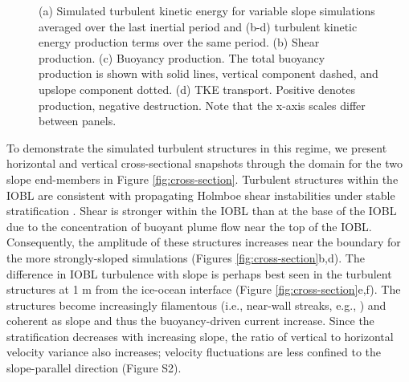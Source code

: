 \documentclass[draft]{agujournal2019}
\begin{document}
\begin{figure}
\begin{minipage}{0.5\textwidth}
    \end{minipage}
    \caption{(a) Simulated turbulent kinetic energy for variable slope simulations averaged over the last inertial period and (b-d) turbulent kinetic energy production terms over the same period. (b) Shear production. (c) Buoyancy production. The total buoyancy production is shown with solid lines, vertical component dashed, and upslope component dotted. (d) TKE transport. Positive denotes production, negative destruction. Note that the x-axis scales differ between panels.}
    \label{fig:tke_budget}
\end{figure}

To demonstrate the simulated turbulent structures in this regime, we present horizontal and vertical cross-sectional  snapshots through the domain for the two slope end-members in Figure \ref{fig:cross-section}. Turbulent structures within the IOBL are consistent with propagating Holmboe shear instabilities under stable stratification \cite{carpenter_identifying_2010}. Shear is stronger within the IOBL than at the base of the IOBL due to the concentration of buoyant plume flow near the top of the IOBL. Consequently, the amplitude of these structures increases near the boundary for the more strongly-sloped simulations (Figures \ref{fig:cross-section}b,d). The difference in IOBL turbulence with slope is perhaps best seen in the turbulent structures at 1 m from the ice-ocean interface (Figure \ref{fig:cross-section}e,f). The structures become increasingly filamentous (i.e., near-wall streaks, e.g., ) and coherent as slope and thus the buoyancy-driven current increase. Since the stratification decreases with increasing slope, the ratio of vertical to horizontal velocity variance also increases;  velocity fluctuations are less confined to the slope-parallel direction (Figure S2). 
\end{document}
